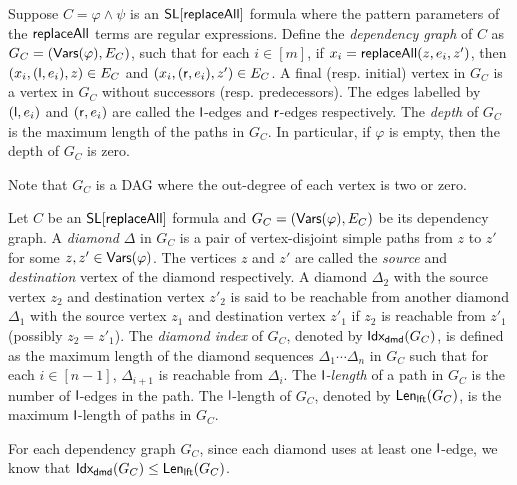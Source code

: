 \begin{definition}
\label{def:dep-graph}
	Suppose $C= \varphi \wedge \psi$ is an $\mathsf{SL}[\mathsf{replaceAll}]$ formula where the pattern parameters of the $\mathsf{replaceAll}$ terms are regular expressions. %
Define the \emph{dependency graph} of $C$ as $G_C= (\mathsf{Vars}(\varphi), E_C)$, such that for each $i \in [m]$, if $x_i = \mathsf{replaceAll}(z, e_i, z')$, then $(x_i, (\mathsf{l}, e_i), z) \in E_C$ and $(x_i, (\mathsf{r}, e_i), z') \in E_C$. A final (resp. initial) vertex in $G_C$ is a vertex in $G_C$ without successors (resp. predecessors). The edges labelled by $(\mathsf{l}, e_i)$ and $(\mathsf{r}, e_i)$ are called the $\mathsf{l}$-edges and $\mathsf{r}$-edges respectively. The \emph{depth} of $G_C$ is the maximum length of the paths in $G_C$. In particular, if $\varphi$ is empty, then the depth of $G_C$ is zero. 
\end{definition}
Note that $G_C$ is a DAG where the out-degree of each vertex is two or zero. 

\begin{definition}
Let $C$  be an  $\mathsf{SL}[\mathsf{replaceAll}]$ formula and $G_C=(\mathsf{Vars}(\varphi), E_C)$ be its dependency graph. A \emph{diamond} $\Delta$ in $G_C$ is a pair of vertex-disjoint simple paths from $z$ to $z'$ for some $z,z' \in \mathsf{Vars}(\varphi)$. The vertices $z$ and $z'$ are called the \emph{source} and \emph{destination} vertex of the diamond respectively. A diamond $\Delta_2$ with the source vertex $z_2$ and destination vertex $z'_2$ is said to be reachable from  another diamond $\Delta_1$ with the source vertex $z_1$ and destination vertex $z'_1$ if $z_2$ is reachable from $z'_1$ (possibly $z_2= z'_1$). The \emph{diamond index} of $G_C$, denoted by ${\sf Idx_{dmd}}(G_C)$, is defined as the maximum length of the diamond sequences $\Delta_1 \cdots \Delta_n$ in $G_C$ such that for each $i \in [n-1]$, $\Delta_{i+1}$ is reachable from $\Delta_i$. The \emph{$\mathsf{l}$-length} of a path in $G_C$ is the number of $\mathsf{l}$-edges in the path. The $\mathsf{l}$-length of $G_C$, denoted by ${\sf Len_{lft}}(G_C)$, is the maximum $\mathsf{l}$-length of paths in $G_C$.
\end{definition}
For each dependency graph $G_C$, since each diamond uses at least one $\mathsf{l}$-edge, we know that ${\sf Idx_{dmd}}(G_C) \le {\sf Len_{lft}}(G_C)$.

